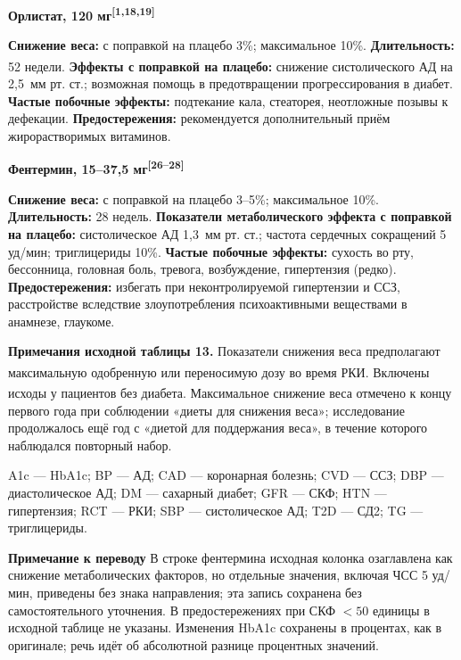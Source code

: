 \documentclass[11pt,a4paper]{article}
\newcommand{\src}[1]{\textsuperscript{[#1]}}
\newcommand{\editorial}[1]{\par\begingroup\small\color{black!70}\textbf{Примечание к переводу} #1\par\endgroup}
\newcommand{\heading}[1]{\par\medskip\textbf{#1}\par}
\begin{document}
\heading{Орлистат, 120 мг\src{1,18,19}}
\textbf{Снижение веса:} с поправкой на плацебо 3\%; максимальное 10\%. \textbf{Длительность:} 52 недели\textsuperscript{\ddag}. \textbf{Эффекты с поправкой на плацебо:} снижение систолического АД на 2,5~мм рт. ст.; возможная помощь в предотвращении прогрессирования в диабет. \textbf{Частые побочные эффекты:} подтекание кала, стеаторея, неотложные позывы к дефекации. \textbf{Предостережения:} рекомендуется дополнительный приём жирорастворимых витаминов.

\heading{Фентермин, 15--37,5 мг\src{26--28}}
\textbf{Снижение веса:} с поправкой на плацебо 3--5\%; максимальное 10\%. \textbf{Длительность:} 28 недель. \textbf{Показатели метаболического эффекта с поправкой на плацебо:} систолическое АД 1,3~мм рт. ст.; частота сердечных сокращений 5 уд/мин; триглицериды 10\%. \textbf{Частые побочные эффекты:} сухость во рту, бессонница, головная боль, тревога, возбуждение, гипертензия (редко). \textbf{Предостережения:} избегать при неконтролируемой гипертензии и ССЗ, расстройстве вследствие злоупотребления психоактивными веществами в анамнезе, глаукоме.

\textbf{Примечания исходной таблицы 13.} Показатели снижения веса предполагают максимальную одобренную или переносимую дозу во время РКИ. \textsuperscript{\dag} Включены исходы у пациентов без диабета. \textsuperscript{\ddag} Максимальное снижение веса отмечено к концу первого года при соблюдении «диеты для снижения веса»; исследование продолжалось ещё год с «диетой для поддержания веса», в течение которого наблюдался повторный набор.

A1c --- HbA1c; BP --- АД; CAD --- коронарная болезнь; CVD --- ССЗ; DBP --- диастолическое АД; DM --- сахарный диабет; GFR --- СКФ; HTN --- гипертензия; RCT --- РКИ; SBP --- систолическое АД; T2D --- СД2; TG --- триглицериды.
\editorial{В строке фентермина исходная колонка озаглавлена как снижение метаболических факторов, но отдельные значения, включая ЧСС 5 уд/мин, приведены без знака направления; эта запись сохранена без самостоятельного уточнения. В предостережениях при СКФ $<50$ единицы в исходной таблице не указаны. Изменения HbA1c сохранены в процентах, как в оригинале; речь идёт об абсолютной разнице процентных значений.}
\end{document}
